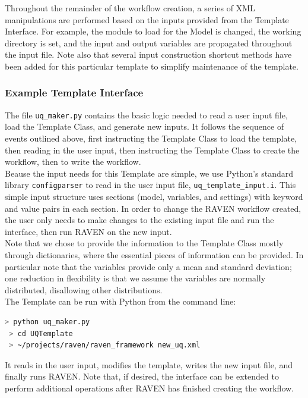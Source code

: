 Throughout the remainder of the workflow creation, a series of XML manipulations are performed based on the inputs
%
provided from the Template Interface. For example, the module to load for the Model is changed, the working directory is
%
set, and the input and output variables are propagated throughout the input file. Note also that several input
%
construction shortcut methods have been added for this particular template to simplify maintenance of the template.


\subsubsection{Example Template Interface}
%
The file \texttt{uq\_maker.py} contains the basic logic needed to read a user input file, load the Template Class, and
%
generate new inputs. It follows the sequence of events outlined above, first instructing the Template Class to load the
%
template, then reading in the user input, then instructing the Template Class to create the workflow, then to write the
%
workflow.
\\

Beause the input needs for this Template are simple, we use Python's standard library \texttt{configparser} to read in
%
the user input file, \texttt{uq\_template\_input.i}. This simple input structure uses sections (model, variables, and
%
settings) with keyword and value pairs in each section. In order to change the RAVEN workflow created, the user only
%
needs to make changes to the existing input file and run the interface, then run RAVEN on the new input.
\\

Note that we chose to provide the information to the Template Class mostly through dictionaries, where the essential
%
pieces of information can be provided. In particular note that the variables provide only a mean and standard deviation;
%
one reduction in flexibility is that we assume the variables are normally distributed, disallowing other distributions.
\\

The Template can be run with Python from the command line:
%
\begin{lstlisting}[language=bash]
 > python uq_maker.py
 > cd UQTemplate
 > ~/projects/raven/raven_framework new_uq.xml
\end{lstlisting}
%
It reads in the user input, modifies the template, writes the new input file, and finally runs RAVEN. Note that, if
%
desired, the interface can be extended to perform additional operations after RAVEN has finished creating the workflow.
